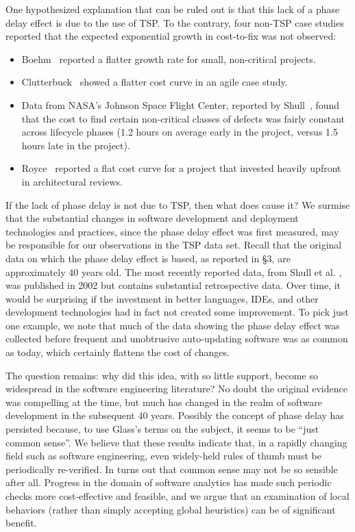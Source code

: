 \documentclass{sig-alternate}
\newcommand{\bi}{\begin{itemize}[leftmargin=0.4cm]}
\newcommand{\ei}{\end{itemize}}
\begin{document}
One hypothesized explanation that can be ruled out is that this lack of
a phase delay effect is due to the use of TSP.
  To the contrary, four non-TSP  case studies reported that the expected exponential growth in cost-to-fix was not observed:
  \bi
  \item
  Boehm~\cite{Boehm80} reported a flatter growth rate for small, non-critical projects.
  \item
  Clutterbuck~\cite{Clutterbuck09} showed a flatter cost curve in an agile case study. 
  \item 
  Data from NASA's Johnson Space Flight Center, reported by Shull~\cite{Shull02}, found that the cost to find certain non-critical classes of defects was fairly constant across lifecycle phases (1.2 hours on average early in the project, versus 1.5 hours late in the project). 
  \item
  Royce~\cite{Royce98} reported a flat cost curve for a project that invested heavily upfront in architectural reviews.
\ei
If the lack of phase delay is not due to TSP, then what does cause it?
We surmise that the substantial changes in software development and deployment technologies and practices, since the phase delay effect was first measured, may be responsible for our observations in the TSP data set. Recall that the original data on which the phase delay effect is based, as reported in \S3, are approximately 40 years old. The most recently reported data, from Shull et al. \cite{Shull02}, was published in 2002 but contains substantial retrospective data. Over time, it would be surprising if the investment in better languages, IDEs, and other development technologies had in fact not created some improvement. To pick just one example, we note that much of the data showing the phase delay effect was collected before frequent and unobtrusive auto-updating software was as common as today, which certainly flattens the cost of changes.



The question remains: why did this idea, with so little support, become so widespread in the software engineering literature? No doubt the original evidence was compelling at the time, but much has changed in the realm of software development in the subsequent 40 years. Possibly the concept of phase delay has persisted because, to use Glass's terms on the subject, it seems to be ``just common sense''\cite{glass02}. 
We believe that these results indicate that, in a rapidly changing field such as software engineering, even widely-held rules of thumb must be periodically re-verified. In turns out that common sense may not be so sensible after all.
Progress in the domain of software analytics has made such periodic checks more cost-effective and feasible, and we argue that an examination of local behaviors (rather than simply accepting global heuristics) can be of significant benefit.
\end{document}

